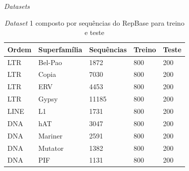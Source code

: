 \documentclass[%
  xcolor=table,%
  10pt,%
  aspectratio = 169,%
  compress,%
  t,%
]{beamer}%
\begin{document}
\begin{frame}{}{\textit{Datasets}}
    \begin{table}
        \centering
        \caption{\textit{Dataset} 1 composto por sequências do RepBase para treino e teste}
        \label{tab:dataset1}
        \begin{tabular}{|l|l|l|l|l|}
            \hline
            \rowcolor[HTML]{C0C0C0} 
            \textbf{Ordem}              & \textbf{Superfamília}          & \textbf{Sequências}         & \textbf{Treino}            & \textbf{Teste}             \\ \hline
            {\color[HTML]{CB0000} LTR}  & {\color[HTML]{CB0000} Bel-Pao} & {\color[HTML]{CB0000} 1872} & {\color[HTML]{CB0000} 800} & {\color[HTML]{CB0000} 200} \\ \hline
            \rowcolor[HTML]{EFEFEF} 
            LTR                         & Copia                          & 7030                        & 800                        & 200                        \\ \hline
            LTR                         & ERV                            & 4453                        & 800                        & 200                        \\ \hline
            \rowcolor[HTML]{EFEFEF} 
            LTR                         & Gypsy                          & 11185                       & 800                        & 200                        \\ \hline
            {\color[HTML]{CB0000} LINE} & {\color[HTML]{CB0000} L1}      & {\color[HTML]{CB0000} 1731} & {\color[HTML]{CB0000} 800} & {\color[HTML]{CB0000} 200} \\ \hline
            \rowcolor[HTML]{EFEFEF} 
            DNA                         & hAT                            & 3047                        & 800                        & 200                        \\ \hline
            DNA                         & Mariner                        & 2591                        & 800                        & 200                        \\ \hline
            \rowcolor[HTML]{EFEFEF} 
            {\color[HTML]{CB0000} DNA}  & {\color[HTML]{CB0000} Mutator} & {\color[HTML]{CB0000} 1382} & {\color[HTML]{CB0000} 800} & {\color[HTML]{CB0000} 200} \\ \hline
            {\color[HTML]{CB0000} DNA}  & {\color[HTML]{CB0000} PIF}     & {\color[HTML]{CB0000} 1131} & {\color[HTML]{CB0000} 800} & {\color[HTML]{CB0000} 200} \\ \hline
        \end{tabular}
    \end{table}
\end{frame}
\end{document}

